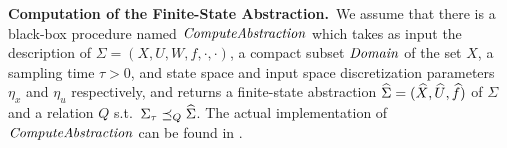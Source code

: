 \smallskip
\noindent\textbf{Computation of the Finite-State Abstraction.}\
We assume that there is a black-box procedure named $\mathit{ComputeAbstraction}$ which takes as input the description of $\Sigma = (X,U,W,f,\cdot,\cdot)$, a compact subset $\mathit{Domain}$ of the set $X$, a sampling time $\tau>0$, and state space and input space discretization parameters $\eta_x$ and $\eta_u$ respectively, and returns a finite-state abstraction $\widehat{\Sigma} = (\widehat{X},\widehat{U},\widehat{f})$ of $\Sigma$ and a relation $Q$ s.t.\ $\Sigma_\tau \preceq_{Q} \widehat{\Sigma}$.
The actual implementation of $\mathit{ComputeAbstraction}$ can be found in \cite{reissig2016feedback}.
 

